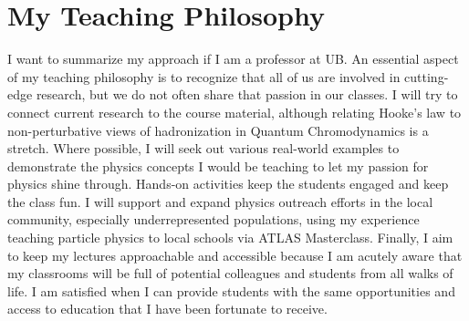 \documentclass[10pt,a4paper,sans]{moderncv} %
\begin{document}
\section{My Teaching Philosophy}
I want to summarize my approach if I am a professor at UB. An essential aspect of my teaching philosophy is to recognize that all of us are involved in cutting-edge research, but we do not often share that passion in our classes. I will try to connect current research to the course material, although relating Hooke's law to non-perturbative views of hadronization in Quantum Chromodynamics is a stretch. Where possible, I will seek out various real-world examples to demonstrate the physics concepts I would be teaching to let my passion for physics shine through. Hands-on activities keep the students engaged and keep the class fun. I will support and expand physics outreach efforts in the local community, especially underrepresented populations, using my experience teaching particle physics to local schools via ATLAS Masterclass. Finally, I aim to keep my lectures approachable and accessible because I am acutely aware that my classrooms will be full of potential colleagues and students from all walks of life. I am satisfied when I can provide students with the same opportunities and access to education that I have been fortunate to receive.

\printbibliography
\end{document}
